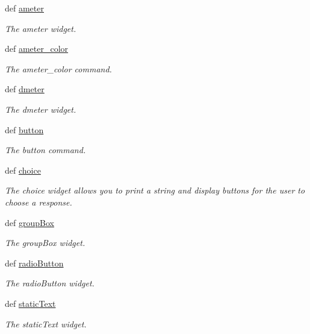 \begin{DoxyCompactItemize}
def \hyperlink{group___widgets_ga01020dc360dfbd9f463bf5478e42566e}{ameter}
\begin{DoxyCompactList}\small\item\em The ameter widget. \end{DoxyCompactList}\item 
def \hyperlink{group___widgets_ga87633e350f72285b45b9df28eff6ba18}{ameter\-\_\-color}
\begin{DoxyCompactList}\small\item\em The ameter\-\_\-color command. \end{DoxyCompactList}\item 
def \hyperlink{group___widgets_gaa521dbc7f8860a624135caaa58ba516d}{dmeter}
\begin{DoxyCompactList}\small\item\em The dmeter widget. \end{DoxyCompactList}\item 
def \hyperlink{group___widgets_ga7eeeb3ce522c7891c3f76cdc79f11192}{button}
\begin{DoxyCompactList}\small\item\em The button command. \end{DoxyCompactList}\item 
def \hyperlink{group___widgets_gad1b05a5ee17690c241c30b6a15437c8b}{choice}
\begin{DoxyCompactList}\small\item\em The choice widget allows you to print a string and display buttons for the user to choose a response. \end{DoxyCompactList}\item 
def \hyperlink{group___widgets_ga794dde0f8237dcfcd90646e0eeb2ca65}{group\-Box}
\begin{DoxyCompactList}\small\item\em The group\-Box widget. \end{DoxyCompactList}\item 
def \hyperlink{group___widgets_gaeb3dc4a2ae0923d39259c6583b4ed240}{radio\-Button}
\begin{DoxyCompactList}\small\item\em The radio\-Button widget. \end{DoxyCompactList}\item 
def \hyperlink{group___widgets_ga1f298ec66c48404b6c9deb6bebb0815c}{static\-Text}
\begin{DoxyCompactList}\small\item\em The static\-Text widget. \end{DoxyCompactList}\item 

\end{DoxyCompactItemize}
